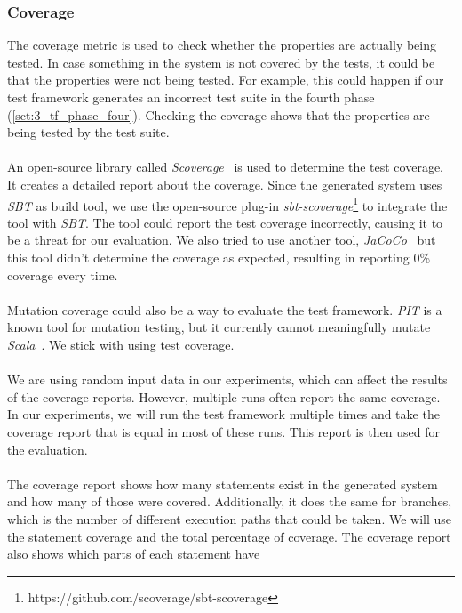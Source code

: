 \subsubsection{Coverage}
The coverage metric is used to check whether the properties are actually being tested. In case something in the system is not covered by the tests, it could be that the properties were not being tested. For example, this could happen if our test framework generates an incorrect test suite in the fourth phase (\autoref{sct:3_tf_phase_four}). Checking the coverage shows that the properties are being tested by the test suite.\\
\\
An open-source library called \textit{Scoverage}~\cite{siteScoverage2017} is used to determine the test coverage. It creates a detailed report about the coverage. Since the generated system uses
\textit{SBT} as build tool, we use the open-source plug-in
\textit{sbt-scoverage}\footnote{https://github.com/scoverage/sbt-scoverage} to
integrate the tool with \textit{SBT}. The tool could report the test coverage incorrectly, causing it to be a threat for our evaluation. We also tried to use another tool, \textit{JaCoCo}~\cite{siteJacoco2017} but this tool didn't determine the coverage as expected, resulting in reporting 0\% coverage every time.\\
\\
Mutation coverage could also be a way to evaluate the test framework. \textit{PIT} is a known tool for mutation testing, but it currently cannot meaningfully mutate \textit{Scala}~\cite{siteSbtPit2017}. We stick with using test coverage.\\
\\
We are using random input data in our experiments, which can affect the results of the coverage reports. However, multiple runs often report the same coverage. In our experiments, we will run the test framework multiple times and take the coverage report that is equal in most of these runs. This report is then used for the evaluation.\\
\\
The coverage report shows how many statements exist in the generated system and
how many of those were covered. Additionally, it does the same for branches,
which is the number of different execution paths that could be taken. We will
use the statement coverage and the total percentage
of coverage. The coverage report also shows which parts of each statement have
